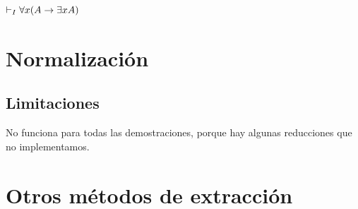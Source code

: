 \begin{obs}\label{fri:obs:forall-exists}
    $\vdash_I \forall x (A \rightarrow \exists x A)$
\end{obs}


\section{Normalización}

\subsection{Limitaciones}

No funciona para todas las demostraciones, porque hay algunas reducciones que no implementamos.

\section{Otros métodos de extracción}

